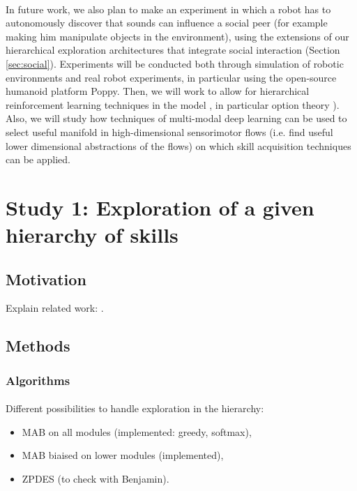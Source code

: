 \documentclass[12pt]{article}
\begin{document}
	\paragraph{}%
	In future work, we also plan to make an experiment in which a robot has to autonomously 
	discover that sounds can influence a social peer (for example making him
	manipulate objects in the environment), using the extensions of our hierarchical exploration architectures that integrate social interaction (Section \ref{sec:social}). 
	Experiments will be conducted both through simulation of robotic environments and real robot
	experiments, in particular using the open-source humanoid platform Poppy.
	Then, we will work to allow for
	hierarchical reinforcement learning techniques in the model \cite{botvinick2012hierarchical}, in particular option
	theory \cite{sutton1999between}). 
	Also, we will study how techniques
	of multi-modal deep learning \cite{ngiam2011multimodal} can be used to select useful manifold in high-dimensional sensorimotor flows 
	(i.e. find useful lower dimensional abstractions of the flows) on which
	skill acquisition techniques can be applied.
	
%

\newpage

\section{Study 1: Exploration of a given hierarchy of skills}
\label{study1}

	\subsection{Motivation}

		Explain related work: \cite{vig, ugur2014, ugur2015}.
	
	
	\subsection{Methods}
		
		\subsubsection{Algorithms}
		
			\paragraph{}
			Different possibilities to handle exploration in the hierarchy:
			\begin{itemize}
				\item MAB on all modules (implemented: greedy, softmax),
				\item MAB biaised on lower modules (implemented),
				\item ZPDES (to check with Benjamin).
			\end{itemize}
			
\end{document}
